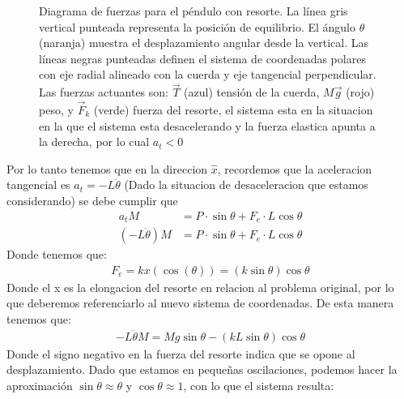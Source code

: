 \documentclass[
  11pt,
  letterpaper,
   addpoints,
   answers
  ]{exam}
\begin{document}
\begin{questions}
\begin{solution}
\begin{figure}[H]
\caption{Diagrama de fuerzas para el péndulo con resorte. La línea gris vertical punteada representa la posición de equilibrio. El ángulo $\theta$ (naranja) muestra el desplazamiento angular desde la vertical. Las líneas negras punteadas definen el sistema de coordenadas polares con eje radial alineado con la cuerda y eje tangencial perpendicular. Las fuerzas actuantes son: $\vec{T}$ (azul) tensión de la cuerda, $M\vec{g}$ (rojo) peso, y $\vec{F}_k$ (verde) fuerza del resorte, el sistema esta en la situacion en la que el sistema esta desacelerando y la fuerza elastica apunta a la derecha, por lo cual $a_{t} < 0 $}
\end{figure}
Por lo tanto  tenemos que en la direccion $\hat{x}$, recordemos que la aceleracion tangencial es $a_t = -L\ddot{\theta}$ (Dado la situacion de desaceleracion que estamos considerando) se debe cumplir que
\begin{align}
  a_{t} M &= P \cdot  \sin\theta + F_e \cdot L \cos\theta\\
  (-L\ddot{\theta})M &= P \cdot  \sin\theta + F_e \cdot L \cos\theta
\end{align}
Donde tenemos que:
\begin{align}
  F_{e} = kx(\cos(\theta)) = (k\sin\theta) \cos\theta
\end{align}
Donde el x es la elongacion del resorte en relacion al problema original, por lo que deberemos referenciarlo al nuevo sistema de coordenadas. De esta manera tenemos que:
\begin{align}
  -L\ddot{\theta}M = Mg\sin\theta - (kL \sin\theta) \cos\theta
\end{align}
Donde el signo negativo en la fuerza del resorte indica que se opone al desplazamiento. Dado que estamos en pequeñas oscilaciones, podemos hacer la aproximación $\sin\theta \approx \theta$ y $\cos\theta \approx 1$, con lo que el sistema resulta:

\end{solution}
\end{questions}
\end{document}
